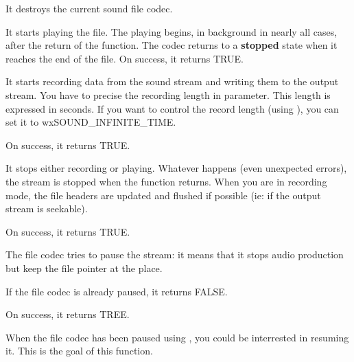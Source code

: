 It destroys the current sound file codec.

\label{wxsoundfilestreamplay}

It starts playing the file. The playing begins, in background
in nearly all cases, after the return of the function. The
codec returns to a {\bf stopped} state when it reaches the
end of the file.
On success, it returns TRUE.

\label{wxsoundfilestreamrecord}

It starts recording data from the sound stream and writing them
to the output stream. You have to precise the recording length in
parameter. This length is expressed in seconds. If you want to
control the record length (using ),
you can set it to wxSOUND_INFINITE_TIME.

On success, it returns TRUE.

\label{wxsoundfilestreamstop}

It stops either recording or playing. Whatever happens (even unexpected
errors), the stream is stopped when the function returns. When you are
in recording mode, the file headers are updated and flushed if possible
(ie: if the output stream is seekable).

On success, it returns TRUE.

\label{wxsoundfilestreampause}

The file codec tries to pause the stream: it means that it stops audio
production but keep the file pointer at the place.

If the file codec is already paused, it returns FALSE.

On success, it returns TREE.

\label{wxsoundfilestreamresume}

When the file codec has been paused using
, you could be interrested in
resuming it. This is the goal of this function.

\label{wxsoundfilestreamisstopped}

\label{wxsoundfilestreamispaused}

